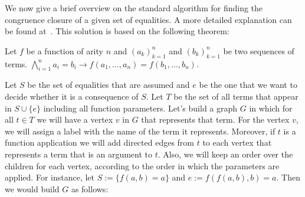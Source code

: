 We now give a brief overview on the standard algorithm for finding the congruence closure of a given set of equalities. A more detailed explanation can be found at~\cite{orig_cong_clos}. This solution is based on the following theorem:

\begin{theorem}[Congruence]
Let $f$ be a function of arity $n$ and ${(a_{k})}_{k = 1}^{n}$ and ${(b_{k})}_{k = 1}^{n}$ be two sequences of terms. $\bigwedge_{i = 1}^{n} a_{i} = b_{i} \rightarrow f(a_{1}, \ldots, a_{n}) = f(b_{1}, \ldots, b_{n})$.
\end{theorem}

Let $S$ be the set of equalities that are assumed and $e$ be the one that we want to decide whether it is a consequence of $S$. Let $T$ be the set of all terms that appear in $S \cup \{e\}$ including all function parameters. Let's build a graph $G$ in which for all $t \in T$ we will have a vertex $v$ in $G$ that represents that term. For the vertex $v$, we will assign a label with the name of the term it represents. Moreover, if $t$ is a function application we will add directed edges from $t$ to each vertex that represents a term that is an argument to $t$. Also, we will keep an order over the children for each vertex, according to the order in which the parameters are applied. For instance, let $S := \{f(a, b) = a\}$ and $e := f(f(a, b), b) = a$. Then we would build $G$ as follows:


\begin{figure}[h]
\centering
{}
\end{figure}

